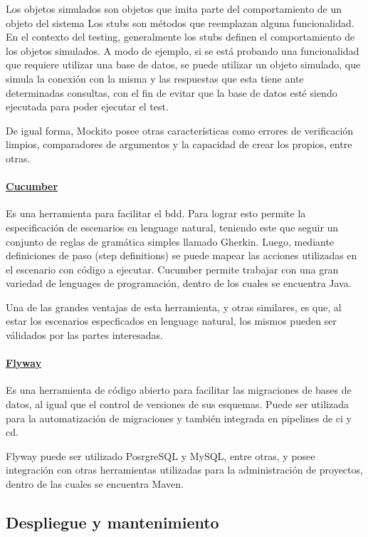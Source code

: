 Los objetos simulados son objetos que imita parte del comportamiento de un objeto del sistema Los stubs son métodos que reemplazan alguna funcionalidad. En el contexto del testing, generalmente los stubs definen el comportamiento de los objetos simulados.
A modo de ejemplo, si se está probando una funcionalidad que requiere utilizar una base de datos, se puede utilizar un objeto simulado, que simula la conexión con la misma y las respuestas que esta tiene ante determinadas consultas, con el fin de evitar que la base de datos esté siendo ejecutada para poder ejecutar el test.

De igual forma, Mockito posee otras características como errores de verificación limpios, comparadores de argumentos y la capacidad de crear los propios, entre otras. 

\paragraph{\href{https://cucumber.io/docs}{Cucumber}}
Es una herramienta para facilitar el \acrshort{bdd}. Para lograr esto permite la especificación de escenarios en lenguage natural, teniendo este que seguir un conjunto de reglas de gramática simples llamado Gherkin. Luego, mediante definiciones de paso (step definitions) se puede mapear las acciones utilizadas en el escenario con código a ejecutar. Cucumber permite trabajar con una gran variedad de lenguages de programación, dentro de los cuales se encuentra Java.

Una de las grandes ventajas de esta herramienta, y otras similares, es que, al estar los escenarios especficados en lenguage natural, los mismos pueden ser válidados por las partes interesadas.

\paragraph{\href{https://www.red-gate.com/products/flyway/community/}{Flyway}}
Es una herramienta de código abierto para facilitar las migraciones de bases de datos, al igual que el control de versiones de sus esquemas. Puede ser utilizada para la automatización de migraciones y también integrada en pipelines de \acrshort{ci} y \acrshort{cd}.

Flyway puede ser utilizado PosrgreSQL y MySQL, entre otras, y posee integración con otras herramientas utilizadas para la administración de proyectos, dentro de las cuales se encuentra Maven. 

\subsection{Despliegue y mantenimiento}

